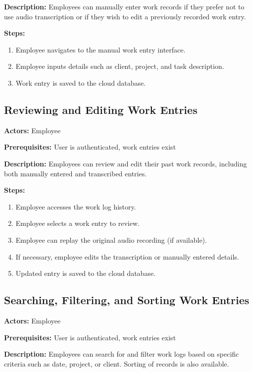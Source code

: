 \documentclass[
  digital,     %
  oneside,     %
  nosansbold,  %
  nocolorbold, %
  lof,         %
  lot,         %
]{fithesis4}
\begin{document}
\noindent \textbf{Description:}  
Employees can manually enter work records if they prefer not to use audio transcription or if they wish to edit a previously recorded work entry.

\noindent \textbf{Steps:}
\begin{enumerate}
    \item Employee navigates to the manual work entry interface.
    \item Employee inputs details such as client, project, and task description.
    \item Work entry is saved to the cloud database.
\end{enumerate}

\subsection{Reviewing and Editing Work Entries}

\noindent \textbf{Actors:} Employee

\noindent \textbf{Prerequisites:} User is authenticated, work entries exist

\noindent \textbf{Description:}  
Employees can review and edit their past work records, including both manually entered and transcribed entries.

\noindent \textbf{Steps:}
\begin{enumerate}
    \item Employee accesses the work log history.
    \item Employee selects a work entry to review.
    \item Employee can replay the original audio recording (if available).
    \item If necessary, employee edits the transcription or manually entered details.
    \item Updated entry is saved to the cloud database.
\end{enumerate}

\subsection{Searching, Filtering, and Sorting Work Entries}

\noindent \textbf{Actors:} Employee

\noindent \textbf{Prerequisites:} User is authenticated, work entries exist

\noindent \textbf{Description:}  
Employees can search for and filter work logs based on specific criteria such as date, project, or client. Sorting of records is also available.
\end{document}
